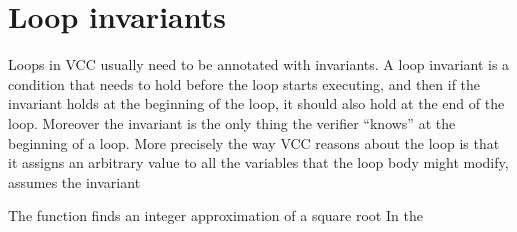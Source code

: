 \section{Loop invariants}

Loops in VCC usually need to be annotated with invariants.
A loop invariant is a condition that needs to hold before
the loop starts executing, and then if the invariant holds
at the beginning of the loop, it should also hold at the
end of the loop.
Moreover the invariant is the only thing the verifier ``knows''
at the beginning of a loop. 
More precisely the way VCC reasons about the loop is that
it assigns an arbitrary value to all the variables that the loop body might modify,
assumes the invariant


\noindent
The  function finds an integer approximation of a
square root 
In the
